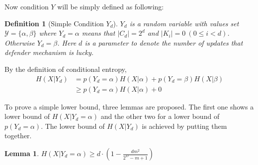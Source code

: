 \documentclass[10pt, conference, compsocconf]{IEEEtran}
\newtheorem{mydef}{Definition}
\newtheorem{mylemma}{Lemma}
\begin{document}
		Now condition $Y$ will be simply defined as following:
		\begin{mydef}[Simple Condition $Y_d$]
			$Y_d$ is a random variable with values set
			$\mathcal Y = \{ \alpha, \beta \}$ where
			$Y_d = \alpha$ means that $|C_d| = 2^d$
			and $|K_i| = 0~(0 \leq i < d)$.
			Otherwise $Y_d = \beta$.
			Here $d$ is a parameter to denote the number
			of updates that defender mechanism is lucky.
		\end{mydef}
		
		By the definition of conditional entropy,
		\begin{align*}
			H(X|Y_d) &= p(Y_d = \alpha) H(X | \alpha) + p(Y_d = \beta) H(X | \beta)\\
				&\geq p(Y_d = \alpha) H(X | \alpha) + 0
		\end{align*}
		
		To prove a simple lower bound, three lemmas are proposed.
		The first one shows a lower bound of $H(X | Y_d = \alpha)$
		and the other two for a lower bound of $p(Y_d = \alpha)$.
		The lower bound of $H(X | Y_d)$ is achieved by putting
		them together.
		
		\begin{mylemma}\label{lem1}
			$H(X|Y_d = \alpha) \geq d \cdot (1-\frac{dm^2}{2^D-m+1})$
		\end{mylemma}
		
\end{document}
